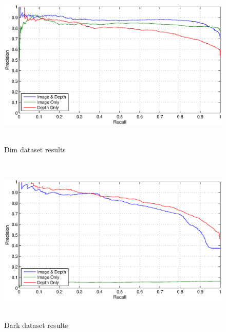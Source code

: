 \documentclass[]{spie}  %
\begin{document}
\begin{figure}[!htb]
        \centering
        \includegraphics[trim = 0mm 0mm 0mm 0mm, clip, height=8cm]{figures/pr_dim.eps}    
        \caption{Dim dataset results}
        \label{fig:pr_dim}
\end{figure}

\begin{figure}[!htb]
        \centering
        \includegraphics[trim = 0mm 0mm 0mm 0mm, clip, height=8cm]{figures/pr_dark.eps}      
        \caption{Dark dataset results}
        \label{fig:pr_dark}
\end{figure}


\end{document}

